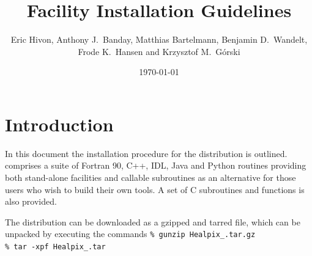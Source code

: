 \documentclass[12pt,twoside]{article}
\begin{document}
\title{\healpix Facility Installation Guidelines}
\author{Eric Hivon, Anthony J.~Banday, Matthias Bartelmann, Benjamin D.~Wandelt,
Frode K.~Hansen and Krzysztof M.~G\'orski}

\date{\today}

\frontpage
\tableofcontents
\newpage

\section{Introduction}

In this document the installation procedure for the \healpix
distribution is outlined. \healpix comprises a suite of Fortran 90, C++, 
IDL, Java and Python routines
providing both stand-alone facilities and callable subroutines as an alternative
for those users who wish to build their own tools.
A set of C subroutines and functions is also provided. 

The distribution can be downloaded as a gzipped and tarred file,
which can be unpacked by executing the commands \hfill\newline
{\tt \% gunzip Healpix\_\hpxversion.tar.gz}\hfill\\
{\tt \% tar -xpf Healpix\_\hpxversion.tar}\hfill\\
\end{document}
